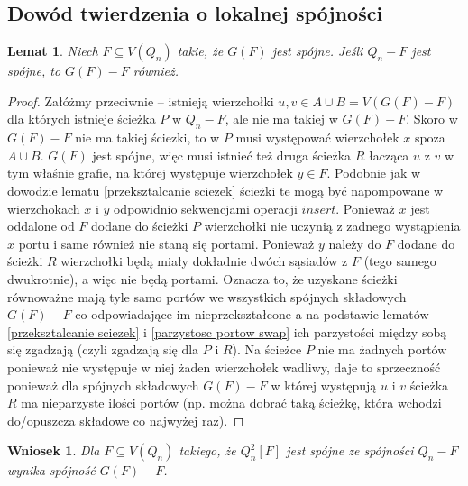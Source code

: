 \documentclass{pracamgr}
\newtheorem{lemma}[theorem]{Lemat}
\newtheorem{corollary}[theorem]{Wniosek}
\begin{document}
   \subsection{Dowód twierdzenia o lokalnej spójności}
    \begin{lemma}\label{Q_n-F spojne => G(F)-F spojne (1 skladowa)}
     Niech $F\subseteq V(Q_n)$ takie, że $G(F)$ jest spójne. Jeśli $Q_n-F$ jest spójne, to $G(F)-F$ również.
    \end{lemma}
    \begin{proof}
     Załóżmy przeciwnie -- istnieją wierzchołki $u,v\in A\cup B=V(G(F)-F)$ dla których istnieje ścieżka $P$ w $Q_n-F$, ale nie ma takiej w  $G(F)-F$.
     Skoro w $G(F)-F$ nie ma takiej ściezki, to w $P$ musi występować wierzchołek $x$ spoza $A\cup B$.\newline
     $G(F)$ jest spójne, więc musi istnieć też druga ścieżka $R$ łacząca $u$ z $v$ w tym właśnie grafie, na której występuje wierzchołek $y\in F$.\newline
     Podobnie jak w dowodzie lematu \ref{przeksztalcanie sciezek} 
     ścieżki te mogą być napompowane w wierzchokach $x$ i $y$ odpowidnio sekwencjami operacji $insert$.\newline
     Ponieważ $x$ jest oddalone od $F$ dodane do ścieżki $P$ wierzchołki nie uczynią z zadnego wystąpienia $x$ portu i same również nie staną się portami.
     Ponieważ $y$ należy do $F$ dodane do ścieżki $R$ wierzchołki będą miały dokładnie dwóch sąsiadów z $F$ (tego samego dwukrotnie), a więc nie będą portami.\newline
     Oznacza to, że uzyskane ścieżki równoważne mają tyle samo portów we wszystkich spójnych składowych $G(F)-F$ co odpowiadające im nieprzekształcone
     a na podstawie lematów \ref{przeksztalcanie sciezek} i \ref{parzystosc portow swap} ich parzystości między sobą się zgadzają (czyli zgadzają się dla $P$ i $R$).
     Na ścieżce $P$ nie ma żadnych portów ponieważ nie występuje w niej żaden wierzchołek wadliwy,
     daje to sprzeczność ponieważ dla spójnych składowych $G(F)-F$ w której występują
     $u$ i $v$ ścieżka $R$ ma nieparzyste ilości portów (np. można dobrać taką ścieżkę, która wchodzi do/opuszcza składowe co najwyżej raz).
    \end{proof}
    \begin{corollary}\label{Q_n-F spojne => Q_n^2[F]-F spojne (1 skladowa)}
     Dla $F\subseteq V(Q_n)$ takiego, że $Q_n^2[F]$ jest spójne ze spójności $Q_n-F$ wynika spójność $G(F)-F$.
    \end{corollary}
\end{document}
